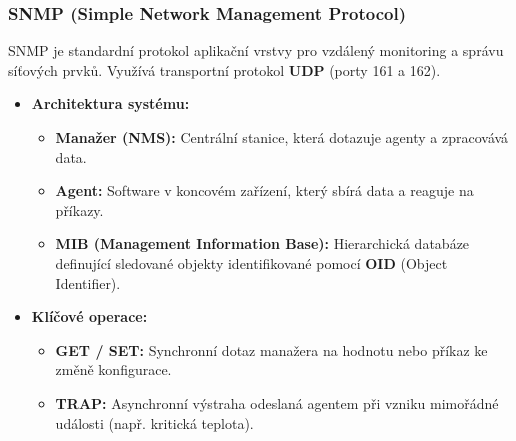     \subsubsection{SNMP (Simple Network Management Protocol)}
        SNMP je standardní protokol aplikační vrstvy pro vzdálený monitoring a správu síťových prvků. Využívá transportní protokol \textbf{UDP} (porty 161 a 162).
        \begin{itemize}
            \item \textbf{Architektura systému:}
            \begin{itemize}
                \item \textbf{Manažer (NMS):} Centrální stanice, která dotazuje agenty a zpracovává data.
                \item \textbf{Agent:} Software v koncovém zařízení, který sbírá data a reaguje na příkazy.
                \item \textbf{MIB (Management Information Base):} Hierarchická databáze definující sledované objekty identifikované pomocí \textbf{OID} (Object Identifier).
            \end{itemize}
            \item \textbf{Klíčové operace:}
            \begin{itemize}
                \item \textbf{GET / SET:} Synchronní dotaz manažera na hodnotu nebo příkaz ke změně konfigurace.
                \item \textbf{TRAP:} Asynchronní výstraha odeslaná agentem při vzniku mimořádné události (např. kritická teplota).
            \end{itemize}
        \end{itemize}

